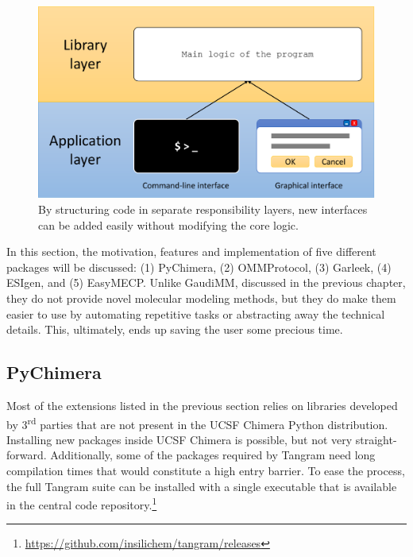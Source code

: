\begin{figure}
	\begin{Center}
		\includegraphics[width=\textwidth]{./figures/05/library-vs-app-layers-crop.pdf}
	\end{Center}
	\caption[Uncoupled software architecture]{By structuring code in separate responsibility layers, new interfaces can be added easily without modifying the core logic.}
	\label{fig:uncoupled-layers}
\end{figure}

In this section, the motivation, features and implementation of five different packages will be discussed: (1) PyChimera, (2) OMMProtocol, (3) Garleek, (4) ESIgen, and (5) EasyMECP. Unlike GaudiMM, discussed in the previous chapter, they do not provide novel molecular modeling methods, but they do make them easier to use by automating repetitive tasks or abstracting away the technical details. This, ultimately, ends up saving the user some precious time.

\subsection{PyChimera}

Most of the extensions listed in the previous section relies on libraries developed by 3\textsuperscript{rd} parties that are not present in the UCSF Chimera Python distribution. Installing new packages inside UCSF Chimera is possible, but not very straight-forward. Additionally, some of the packages required by Tangram need long compilation times that would constitute a high entry barrier. To ease the process, the full Tangram suite can be installed with a single executable that is available in the central code repository.\footnote{\url{https://github.com/insilichem/tangram/releases}}

